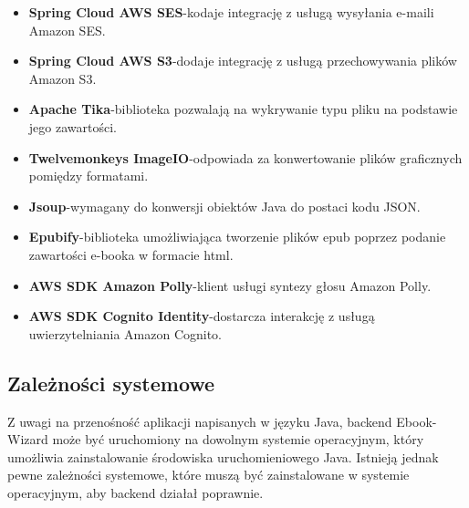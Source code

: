 \begin{itemize}
    \item \textbf{Spring Cloud AWS SES}\hspace{0.6em}-\hspace{0.6em}kodaje integrację z usługą wysyłania e-maili Amazon SES.
    \item \textbf{Spring Cloud AWS S3}\hspace{0.6em}-\hspace{0.6em}dodaje integrację z usługą przechowywania plików Amazon S3.
    \item \textbf{Apache Tika}\hspace{0.6em}-\hspace{0.6em}biblioteka pozwalają na wykrywanie typu pliku na podstawie jego zawartości.
    \item \textbf{Twelvemonkeys ImageIO}\hspace{0.6em}-\hspace{0.6em}odpowiada za konwertowanie plików graficznych pomiędzy formatami.
    \item \textbf{Jsoup}\hspace{0.6em}-\hspace{0.6em}wymagany do konwersji obiektów Java do postaci kodu JSON.
    \item \textbf{Epubify}\hspace{0.6em}-\hspace{0.6em}biblioteka umożliwiająca tworzenie plików epub poprzez podanie zawartości e-booka w formacie html.
    \item \textbf{AWS SDK Amazon Polly}\hspace{0.6em}-\hspace{0.6em}klient usługi syntezy głosu Amazon Polly.
    \item \textbf{AWS SDK Cognito Identity}\hspace{0.6em}-\hspace{0.6em}dostarcza interakcję z usługą uwierzytelniania Amazon Cognito.
\end{itemize}

\subsection{Zależności systemowe}

Z uwagi na przenośność aplikacji napisanych w języku Java, backend Ebook-Wizard może być uruchomiony na dowolnym systemie operacyjnym, który umożliwia zainstalowanie środowiska uruchomieniowego Java. Istnieją jednak pewne zależności systemowe, które muszą być zainstalowane w systemie operacyjnym, aby backend działał poprawnie.

